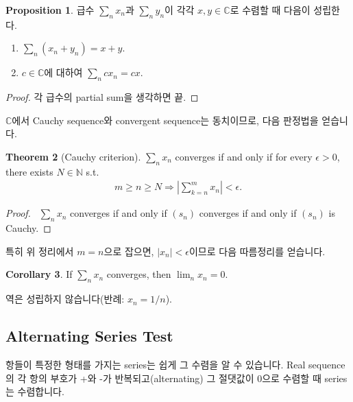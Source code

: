 \documentclass[12pt]{article}
\theoremstyle{definition}
\newtheorem{thm}{Theorem}[section]
\newtheorem{cor}[thm]{Corollary}
\newtheorem{prop}[thm]{Proposition}
\def\NN{\mathbb{N}}
\def\CC{\mathbb{C}}
\def\eps{\epsilon}
\begin{document}
	\begin{prop}
		급수 \(\sum_n x_n\)과 \(\sum_n y_n\)이 각각 \(x, y \in \CC\)로 수렴할 때 다음이 성립한다.
		\begin{enumerate} [label=(\alph*), leftmargin=2\parindent]
			\item
			\(\sum_n (x_n + y_n) = x + y\).
			\item
			\(c \in \CC\)에 대하여 \(\sum_n cx_n = cx\).
		\end{enumerate}
	\end{prop}
	\begin{proof}
		각 급수의 partial sum을 생각하면 끝.
	\end{proof}

\(\CC\)에서 Cauchy sequence와 convergent sequence는 동치이므로, 다음 판정법을 얻습니다.

	\begin{thm}[Cauchy criterion]
		\(\sum_n x_n\) converges if and only if for every \(\eps > 0\), there exists \(N \in \NN\) s.t.
		\begin{align*}
			m \ge n \ge N \Longrightarrow \left | \sum_{k=n}^{m}x_n \right | < \eps.
		\end{align*}
	\end{thm}
	\begin{proof}
		\
		\(\sum_n x_n\) converges if and only if \((s_n)\) converges if and only if \((s_n)\) is Cauchy.
	\end{proof}

특히 위 정리에서 \(m=n\)으로 잡으면, \( \left | x_n \right | < \epsilon\)이므로 다음 따름정리를 얻습니다.

	\begin{cor}
		If \(\sum _n x_n\) converges, then \(\lim _n x_n = 0\).
	\end{cor}

역은 성립하지 않습니다(반례: \(x_n = 1/n\)).

\subsection{Alternating Series Test}

항들이 특정한 형태를 가지는 series는 쉽게 그 수렴을 알 수 있습니다. Real sequence의 각 항의 부호가 +와 -가 반복되고(alternating) 그 절댓값이 0으로 수렴할 때 series는 수렴합니다.
\end{document}
